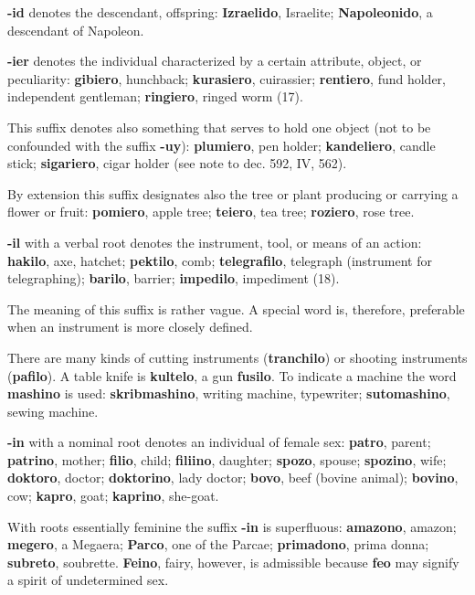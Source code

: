 \textbf{-id} denotes the descendant, offspring: \textbf{Izraelido}, Israelite; \textbf{Napoleonido}, a descendant of Napoleon. 

\textbf{-ier} denotes the individual characterized by a certain attribute, object, or peculiarity: \textbf{gibiero}, hunchback; \textbf{kurasiero}, cuirassier; \textbf{rentiero}, fund holder, independent gentleman; \textbf{ringiero}, ringed worm (17). 

This suffix denotes also something that serves to hold one object (not to be confounded with the suffix \textbf{-uy}): \textbf{plumiero}, pen holder; \textbf{kandeliero}, candle stick; \textbf{sigariero}, cigar holder (see note to dec. 592, IV, 562). 

By extension this suffix designates also the tree or plant producing or carrying a flower or fruit: \textbf{pomiero}, apple tree; \textbf{teiero}, tea tree; \textbf{roziero}, rose tree. 

\textbf{-il} with a verbal root denotes the instrument, tool, or means of an action: \textbf{hakilo}, axe, hatchet; \textbf{pektilo}, comb; \textbf{telegrafilo}, telegraph (instrument for telegraphing); \textbf{barilo}, barrier; \textbf{impedilo}, impediment (18). 

The meaning of this suffix is rather vague. A special word is, therefore, preferable when an instrument is more closely defined. 

There are many kinds of cutting instruments (\textbf{tranchilo}) or shooting instruments (\textbf{pafilo}). A table knife is \textbf{kultelo}, a gun \textbf{fusilo}. To indicate a machine the word \textbf{mashino} is used: \textbf{skribmashino}, writing machine, typewriter; \textbf{sutomashino}, sewing machine. 

\textbf{-in} with a nominal root denotes an individual of female sex: \textbf{patro}, parent; \textbf{patrino}, mother; \textbf{filio}, child; \textbf{filiino}, daughter; \textbf{spozo}, spouse; \textbf{spozino}, wife; \textbf{doktoro}, doctor; \textbf{doktorino}, lady doctor; \textbf{bovo}, beef (bovine animal); \textbf{bovino}, cow; \textbf{kapro}, goat; \textbf{kaprino}, she-goat. 

With roots essentially feminine the suffix \textbf{-in} is superfluous: \textbf{amazono}, amazon; \textbf{megero}, a Megaera; \textbf{Parco}, one of the Parcae; \textbf{primadono}, prima donna; \textbf{subreto}, soubrette. \textbf{Feino}, fairy, however, is admissible because \textbf{feo} may signify a spirit of undetermined sex. 

